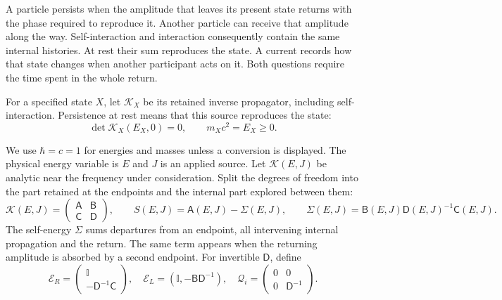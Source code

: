 \documentclass[aps,prx,onecolumn,10pt,notitlepage,nofootinbib,longbibliography]{revtex4-2}
\numberwithin{equation}{section}
\numberwithin{table}{section}
\newcommand{\Id}{\mathbb I}
\begin{document}
A particle persists when the amplitude that leaves its present state returns with the phase required to reproduce it. Another particle can receive that amplitude along the way. Self-interaction and interaction consequently contain the same internal histories. At rest their sum reproduces the state. A current records how that state changes when another participant acts on it. Both questions require the time spent in the whole return.

For a specified state $X$, let ${\mathcal K}_X$ be its retained inverse propagator, including self-interaction. Persistence at rest means that this source reproduces the state:
\begin{equation}
 \det {\mathcal K}_X(E_X,0)=0,\qquad m_Xc^2=E_X\geq0.
 \label{eq:masszero}
\end{equation}


We use $\hbar=c=1$ for energies and masses unless a conversion is displayed. The physical energy variable is $E$ and $J$ is an applied source. Let ${\mathcal K}(E,J)$ be analytic near the frequency under consideration. Split the degrees of freedom into the part retained at the endpoints and the internal part explored between them:
\begin{equation}
 {\mathcal K}(E,J)=\begin{pmatrix}{\mathsf A}&{\mathsf B}\\{\mathsf C}&{\mathsf D}\end{pmatrix},\qquad
 S(E,J)={\mathsf A}(E,J)-\Sigma(E,J),\qquad
 \Sigma(E,J)={\mathsf B}(E,J){\mathsf D}(E,J)^{-1}{\mathsf C}(E,J).
 \label{eq:selfenergy}
\end{equation}
The self-energy $\Sigma$ sums departures from an endpoint, all intervening internal propagation and the return. The same term appears when the returning amplitude is absorbed by a second endpoint. For invertible ${\mathsf D}$, define
\begin{equation}
 {\mathcal E_R}=\begin{pmatrix}\Id\\-{\mathsf D}^{-1}{\mathsf C}\end{pmatrix},\quad
 {\mathcal E_L}=(\Id,-{\mathsf B}{\mathsf D}^{-1}),\quad
 {\mathcal Q_i}=\begin{pmatrix}0&0\\0&{\mathsf D}^{-1}\end{pmatrix}.
\end{equation}
\end{document}
